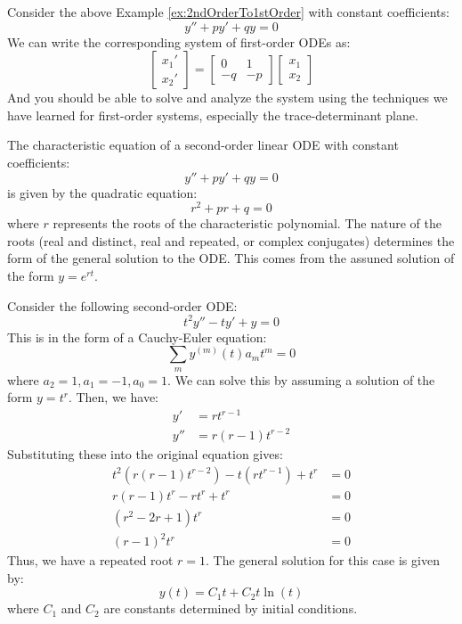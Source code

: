 \documentclass[11pt]{article}
\begin{document}
\begin{example}
    Consider the above Example \ref{ex:2ndOrderTo1stOrder} with constant coefficients:
    $$y'' + p y' + q y = 0
    $$
    We can write the corresponding system of first-order ODEs as:
    $$\begin{bmatrix}
    x_1' \\ x_2'
    \end{bmatrix} = \begin{bmatrix}
    0 & 1 \\
    -q & -p
    \end{bmatrix} \begin{bmatrix}
    x_1 \\ x_2
    \end{bmatrix}
    $$
    And you should be able to solve and analyze the system using the techniques we have learned for first-order systems, especially the trace-determinant plane.

\end{example}

\begin{definition}
    The characteristic equation of a second-order linear ODE with constant coefficients:
    $$y'' + p y' + q y = 0$$
    is given by the quadratic equation:
    \begin{equation}
    r^2 + pr + q = 0
    \end{equation}
    where \( r \) represents the roots of the characteristic polynomial. The nature of the roots (real and distinct, real and repeated, or complex conjugates) determines the form of the general solution to the ODE. This comes from the assuned solution of the form \( y = e^{rt} \).
\end{definition}

\begin{example}
    Consider the following second-order ODE:
    $$t^2 y'' - t y' + y = 0$$
    This is in the form of a Cauchy-Euler equation:
    $$
    \sum_m y^{(m)}(t) a_m t^m = 0
    $$
    where \( a_2 = 1, a_1 = -1, a_0 = 1 \). We can solve this by assuming a solution of the form \( y = t^r \). Then, we have:
    \begin{align*}
        y' &= r t^{r-1} \\
        y'' &= r(r-1) t^{r-2}
    \end{align*}
    Substituting these into the original equation gives:
    \begin{align*}
        t^2 (r(r-1) t^{r-2}) - t (r t^{r-1}) + t^r &= 0 \\
        r(r-1) t^r - r t^r + t^r &= 0 \\
        (r^2 - 2r + 1) t^r &= 0 \\
        (r - 1)^2 t^r &= 0
    \end{align*}
    Thus, we have a repeated root \( r = 1 \). The general solution for this case is given by:
    $$y(t) = C_1 t + C_2 t \ln(t)$$
    where \( C_1 \) and \( C_2 \) are constants determined by initial conditions.
\end{example}
\end{document}

